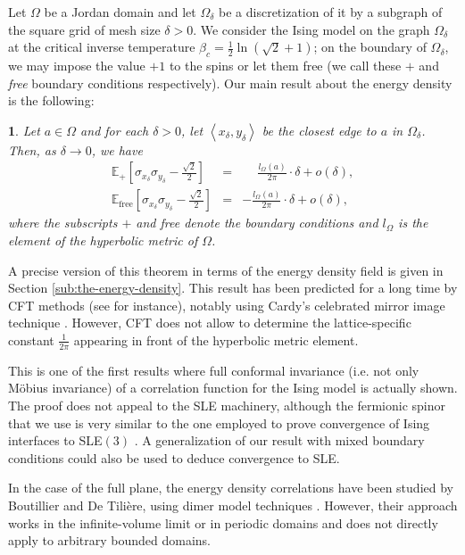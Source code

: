 \documentclass[oneside,english]{amsart}
\numberwithin{equation}{section}
\numberwithin{figure}{section}
\theoremstyle{plain}
\newtheorem*{thm*}{\protect\theoremname}
\theoremstyle{plain}
\theoremstyle{plain}
\theoremstyle{plain}
\theoremstyle{plain}
\theoremstyle{definition}
\theoremstyle{remark}
\providecommand{\theoremname}{Theorem}
\providecommand{\theoremname}{Theorem}
\begin{document}
Let $\Omega$ be a Jordan domain and let $\Omega_{\delta}$ be a discretization
of it by a subgraph of the square grid of mesh size $\delta>0$. We
consider the Ising model on the graph $\Omega_{\delta}$ at the critical
inverse temperature $\beta_{c}=\frac{1}{2}\ln\left(\sqrt{2}+1\right)$;
on the boundary of $\Omega_{\delta}$, we may impose the value $+1$
to the spins or let them free (we call these $+$ and \emph{free}
boundary conditions respectively). Our main result about the energy
density is the following:
\begin{thm*}
Let $a\in\Omega$ and for each $\delta>0$, let $\left\langle x_{\delta},y_{\delta}\right\rangle $
be the closest edge to $a$ in $\Omega_{\delta}$. Then, as $\delta\to0$,
we have 
\begin{eqnarray*}
\mathbb{E}_{+}\left[\sigma_{x_{\delta}}\sigma_{y_{\delta}}-\frac{\sqrt{2}}{2}\right] & = & \phantom{-}\frac{l_{\Omega}\left(a\right)}{2\pi}\cdot\delta+o\left(\delta\right),\\
\mathbb{E}_{\mathrm{free}}\left[\sigma_{x_{\delta}}\sigma_{y_{\delta}}-\frac{\sqrt{2}}{2}\right] & = & -\frac{l_{\Omega}\left(a\right)}{2\pi}\cdot\delta+o\left(\delta\right),
\end{eqnarray*}
where the subscripts $+$ and \emph{free} denote the boundary conditions
and $l_{\Omega}$ is the element of the hyperbolic metric of $\Omega$.
\end{thm*}
A precise version of this theorem in terms of the energy density field
is given in Section \ref{sub:the-energy-density}. This result has
been predicted for a long time by CFT methods (see \cite{di-francesco-mathieu-senechal,burkhard-guim}
for instance), notably using Cardy's celebrated mirror image technique
\cite{cardy-i}. However, CFT does not allow to determine the lattice-specific
constant $\frac{1}{2\pi}$ appearing in front of the hyperbolic metric
element.

This is one of the first results where full conformal invariance (i.e.
not only Möbius invariance) of a correlation function for the Ising
model is actually shown. The proof does not appeal to the SLE machinery,
although the fermionic spinor that we use is very similar to the one
employed to prove convergence of Ising interfaces to SLE$\left(3\right)$
\cite{chelkak-smirnov-ii}. A generalization of our result with mixed
boundary conditions could also be used to deduce convergence to SLE.

In the case of the full plane, the energy density correlations have
been studied by Boutillier and De Tilière, using dimer model techniques
\cite{boutillier-de-tiliere-ii,boutillier-de-tiliere-i}. However,
their approach works in the infinite-volume limit or in periodic domains
and does not directly apply to arbitrary bounded domains.
\end{document}
